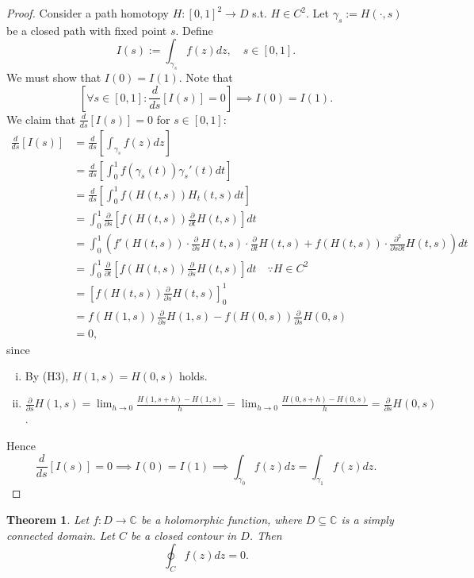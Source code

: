 \documentclass[12pt,openany]{book}
\newtheorem{theorem}{Theorem}[chapter]
\theoremstyle{definition}
\newcommand{\C}{\mathbb{C}}
\newcommand{\of}[1]{\left( #1 \right)}
\begin{document}
	\begin{proof}
		Consider a path homotopy $H:[0,1]^2\to D$ s.t. $H\in C^2$. Let $\gamma_s:=H\of{\cdot, s}$ be a closed path with fixed point $s$. Define \[
		I\of{s}:=\int_{\gamma_s}f\of{z}dz,\quad s\in[0,1].
		\] We must show that $I(0)=I(1)$. Note that \[
		\left[\forall s\in[0,1]:\frac{d}{ds}\left[I(s)\right]=0\right]\implies I(0)=I(1).
		\] We claim that $\displaystyle\frac{d}{ds}\left[I(s)\right]=0$ for $s\in[0,1]$:
		\begin{align*}
			\frac{d}{ds}\left[I(s)\right]&=\frac{d}{ds}\left[\int_{\gamma_s}f\of{z}dz\right]\\
			&=\frac{d}{ds}\left[\int_0^1f\of{\gamma_s\of{t}}\gamma_s'\of{t}dt\right]\\
			&=\frac{d}{ds}\left[\int_0^1f\of{H\of{t,s}}H_t\of{t,s}dt\right]\\
			&=\int_0^1\frac{\partial}{\partial s}\left[f\of{H\of{t,s}}\frac{\partial}{\partial t}H\of{t,s}\right]dt\\
			&=\int_0^1\left(f'\of{H(t,s)}\cdot \frac{\partial}{\partial s}H\of{t,s}\cdot \frac{\partial}{\partial t}H\of{t,s}+f\of{H(t,s)}\cdot \frac{\partial^2}{\partial s\partial t}H\of{t,s}\right)dt\\
			&=\int_0^1\frac{\partial}{\partial t}\left[f\of{H(t,s)}\frac{\partial }{\partial s}H\of{t,s}\right]dt\quad\because H\in C^2\\
			&=\left[f\of{H(t,s)}\frac{\partial }{\partial s}H\of{t,s}\right]_0^1\\
			&=f\of{H\of{1,s}}\frac{\partial}{\partial s}H\of{1,s}-f\of{H\of{0,s}}\frac{\partial}{\partial s}H\of{0,s}\\
			&=0,
		\end{align*} since \begin{enumerate}[(i)]
			\item By (H3), $H\of{1,s}=H\of{0,s}$ holds.
			\item $\displaystyle\frac{\partial}{\partial s}H\of{1,s}=\lim_{h\to 0}\frac{H\of{1,s+h}-H\of{1,s}}{h}=\lim_{h\to 0}\frac{H\of{0,s+h}-H\of{0,s}}{h}=\frac{\partial}{\partial s}H\of{0,s}$.
		\end{enumerate}
		Hence \[
		\frac{d}{ds}\left[I\of{s}\right]=0\implies I\of{0}=I\of{1}\implies
		\int_{\gamma_0}f\of{z}dz=\int_{\gamma_1}f\of{z}dz.
		\]
	\end{proof}
	\vspace{8pt}
	\begin{tcolorbox}[colback=white,colframe=thmcolor,arc=5pt,title={\color{white}\bf Cauchy-Goursat Theorem}]
		\begin{theorem}
			Let $f:D\to\C$ be a holomorphic function, where $D\subseteq\C$ is a simply connected domain. Let $C$ be a closed contour in $D$. Then \[
			\oint_C f\of{z}dz = 0.
			\]
		\end{theorem}
	\end{tcolorbox}
	
\end{document}
